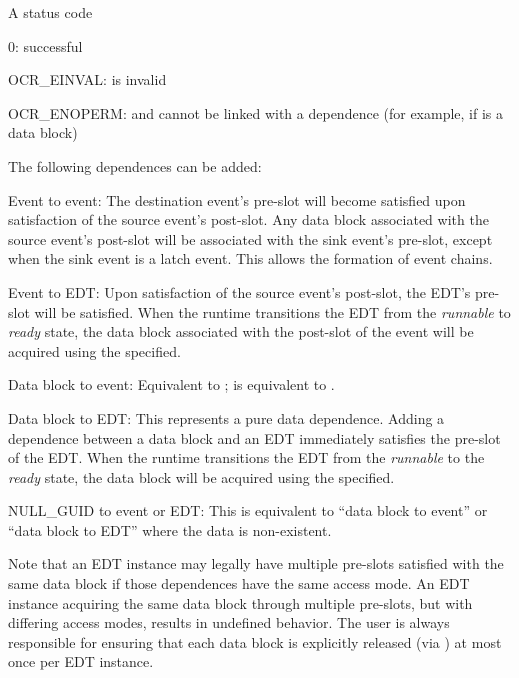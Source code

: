 \returns
A status code
\begin{DoxyItemize}
\item 0\-: successful
\item OCR\_EINVAL:  is invalid
\item OCR\_ENOPERM:  and  cannot be linked with
  a dependence (for example, if  is a data block)
\end{DoxyItemize}

\descr
The following dependences can be added:
\begin{DoxyItemize}
\item Event to event: The destination event's pre-slot will become satisfied
  upon satisfaction of the source event's post-slot. Any data block associated
  with the source event's post-slot will be associated with the sink event's pre-slot,
  except when the sink event is a latch event. This allows the formation of event chains.
\item Event to EDT: Upon satisfaction of the source event's post-slot, the EDT's
  pre-slot will be satisfied. When the runtime transitions the EDT from the
  \emph{runnable} to \emph{ready} state, the data block associated with the
  post-slot of the event will be acquired using the  specified.
\item Data block to event: Equivalent to \hyperlink{func_ocrEventSatisfySlot}{
  };  is
  equivalent to .
\item Data block to EDT: This represents a pure data dependence. Adding a
  dependence between a data block and an EDT immediately satisfies the pre-slot
  of the EDT. When the runtime transitions the EDT from the \emph{runnable}
  to the \emph{ready} state, the data block will be acquired using the
   specified.
\item NULL\_GUID to event or EDT: This is equivalent to ``data block to event''
  or ``data block to EDT'' where the data is non-existent.
\end{DoxyItemize}

Note that an EDT instance may legally have multiple pre-slots satisfied with the same
data block if those dependences have the same access mode. An EDT instance acquiring the
same data block through multiple pre-slots, but with differing access modes, results in
undefined behavior. The user is always responsible for ensuring that each data block is
explicitly released (via \hyperlink{func_ocrDbRelease}{}) at most once
per EDT instance.
